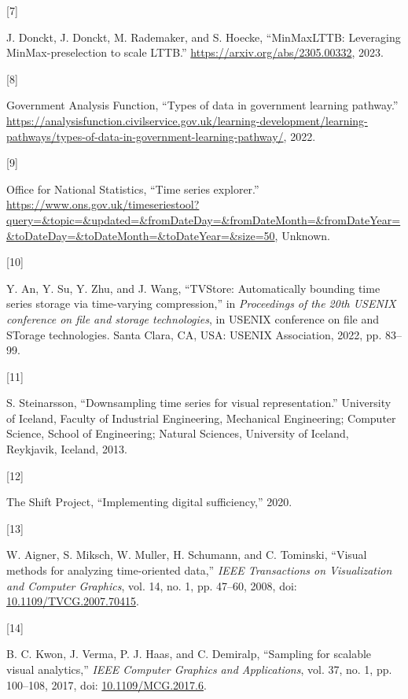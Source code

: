 \documentclass{article}
\newlength{\cslhangindent}
\newlength{\csllabelwidth}
\newlength{\cslentryspacingunit} %
\newenvironment{CSLReferences}[2] %
 {%
  \setlength{\parindent}{0pt}
  \ifodd #1
  \let\oldpar\par
  \def\par{\hangindent=\cslhangindent\oldpar}
  \fi
  \setlength{\parskip}{#2\cslentryspacingunit}
 }%
 {}
\newcommand{\CSLLeftMargin}[1]{\parbox[t]{\csllabelwidth}{#1}}
\newcommand{\CSLRightInline}[1]{\parbox[t]{\linewidth - \csllabelwidth}{#1}\break}
\begin{document}
\begin{CSLReferences}{0}{0}
\leavevmode{}%
\CSLLeftMargin{{[}7{]} }
\CSLRightInline{J. Donckt, J. Donckt, M. Rademaker, and S. Hoecke,
{``MinMaxLTTB: Leveraging MinMax-preselection to scale LTTB.''}
\url{https://arxiv.org/abs/2305.00332}, 2023.}

\leavevmode{}%
\CSLLeftMargin{{[}8{]} }
\CSLRightInline{Government Analysis Function, {``Types of data in
government learning pathway.''}
\url{https://analysisfunction.civilservice.gov.uk/learning-development/learning-pathways/types-of-data-in-government-learning-pathway/},
2022.}

\leavevmode{}%
\CSLLeftMargin{{[}9{]} }
\CSLRightInline{Office for National Statistics, {``Time series
explorer.''}
\url{https://www.ons.gov.uk/timeseriestool?query=\&topic=\&updated=\&fromDateDay=\&fromDateMonth=\&fromDateYear=\&toDateDay=\&toDateMonth=\&toDateYear=\&size=50},
Unknown.}

\leavevmode{}%
\CSLLeftMargin{{[}10{]} }
\CSLRightInline{Y. An, Y. Su, Y. Zhu, and J. Wang, {``TVStore:
Automatically bounding time series storage via time-varying
compression,''} in \emph{Proceedings of the 20th USENIX conference on
file and storage technologies}, in USENIX conference on file and STorage
technologies. Santa Clara, CA, USA: USENIX Association, 2022, pp.
83--99.}

\leavevmode{}%
\CSLLeftMargin{{[}11{]} }
\CSLRightInline{S. Steinarsson, {``Downsampling time series for visual
representation.''} University of Iceland, Faculty of Industrial
Engineering, Mechanical Engineering; Computer Science, School of
Engineering; Natural Sciences, University of Iceland, Reykjavik,
Iceland, 2013.}

\leavevmode{}%
\CSLLeftMargin{{[}12{]} }
\CSLRightInline{The Shift Project, {``Implementing digital
sufficiency,''} 2020.}

\leavevmode{}%
\CSLLeftMargin{{[}13{]} }
\CSLRightInline{W. Aigner, S. Miksch, W. Muller, H. Schumann, and C.
Tominski, {``Visual methods for analyzing time-oriented data,''}
\emph{IEEE Transactions on Visualization and Computer Graphics}, vol.
14, no. 1, pp. 47--60, 2008, doi:
\href{https://doi.org/10.1109/TVCG.2007.70415}{10.1109/TVCG.2007.70415}.}

\leavevmode{}%
\CSLLeftMargin{{[}14{]} }
\CSLRightInline{B. C. Kwon, J. Verma, P. J. Haas, and C. Demiralp,
{``Sampling for scalable visual analytics,''} \emph{IEEE Computer
Graphics and Applications}, vol. 37, no. 1, pp. 100--108, 2017, doi:
\href{https://doi.org/10.1109/MCG.2017.6}{10.1109/MCG.2017.6}.}


\end{CSLReferences}
\end{document}
